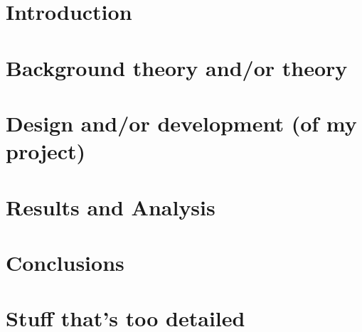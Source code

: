\documentclass[12pt,a4paper]{report}
\begin{document}
\tableofcontents
\listoftables
\listoffigures


\chapter{Introduction}

\chapter{Background theory and/or theory}

\chapter{Design and/or development (of my project)}

\chapter{Results and Analysis}
\chapter{Conclusions}
 
\appendix
\chapter{Stuff that's too detailed}

\end{document}
